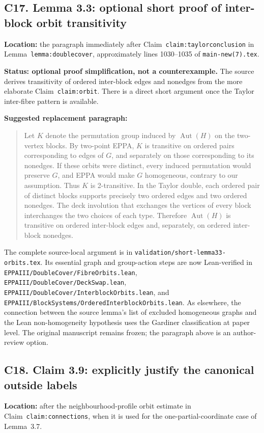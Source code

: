\documentclass[11pt,a4paper]{article}
\begin{document}
\subsection*{C17. Lemma 3.3: optional short proof of inter-block orbit transitivity}
\textbf{Location:} the paragraph immediately after
Claim~\texttt{claim:taylorconclusion} in
Lemma~\texttt{lemma:doublecover}, approximately
lines 1030--1035 of \texttt{main-new(7).tex}.

\textbf{Status: optional proof simplification, not a
counterexample.} The source derives transitivity
of ordered inter-block edges and nonedges from
the more elaborate Claim~\texttt{claim:orbit}.
There is a direct short argument once the Taylor
inter-fibre pattern is available.

\textbf{Suggested replacement paragraph:}
\begin{quote}
Let \(K\) denote the permutation group induced by
\(\operatorname{Aut}(H)\) on the two-vertex blocks.
By two-point EPPA, \(K\) is transitive on ordered
pairs corresponding to edges of \(G\), and separately
on those corresponding to its nonedges. If these
orbits were distinct, every induced permutation
would preserve \(G\), and EPPA would make \(G\)
homogeneous, contrary to our assumption.
Thus \(K\) is 2-transitive.
In the Taylor double, each ordered pair of
distinct blocks supports precisely two
ordered edges and two ordered nonedges.
The deck involution that exchanges the
vertices of every block interchanges the
two choices of each type.
Therefore \(\operatorname{Aut}(H)\) is
transitive on ordered inter-block edges
and, separately, on ordered inter-block
nonedges.
\end{quote}

The complete source-local argument is in
\texttt{validation/short-lemma33-orbits.tex}.
Its essential graph and group-action steps
are now Lean-verified in
\texttt{EPPAIII/DoubleCover/FibreOrbits.lean},
\texttt{EPPAIII/DoubleCover/DeckSwap.lean},
\texttt{EPPAIII/DoubleCover/InterblockOrbits.lean},
and \texttt{EPPAIII/BlockSystems/OrderedInterblockOrbits.lean}.
As elsewhere, the connection between the source
lemma's list of excluded homogeneous graphs and
the Lean non-homogeneity hypothesis uses the
Gardiner classification at paper level.
The original manuscript remains frozen;
the paragraph above is an author-review option.


\subsection*{C18. Claim 3.9: explicitly justify the canonical outside labels}
\textbf{Location:} after the neighbourhood-profile orbit estimate in
Claim~\texttt{claim:connections}, when it is used for the
one-partial-coordinate case of Lemma~3.7.
\end{document}
